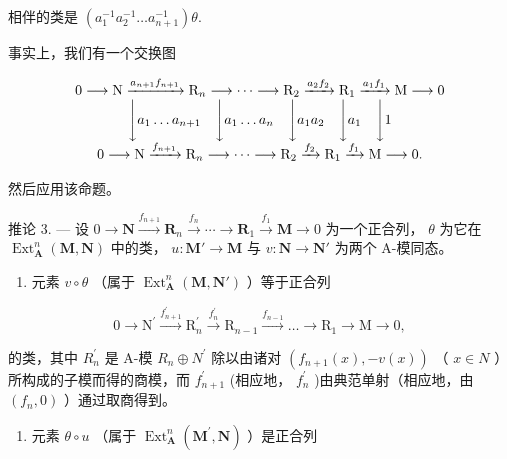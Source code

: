 相伴的类是 \((a_{1}^{-1}a_{2}^{-1}\dots a_{n + 1}^{-1})\theta .\)

事实上，我们有一个交换图

\[
\begin{array}{c} 0 \longrightarrow \mathrm{N} \xrightarrow {a _ {n + 1} f _ {n + 1}} \mathrm{R} _ {n} \longrightarrow \dots \longrightarrow \mathrm{R} _ {2} \xrightarrow {a _ {2} f _ {2}} \mathrm{R} _ {1} \xrightarrow {a _ {1} f _ {1}} \mathrm{M} \longrightarrow 0 \\ \Biggl \downarrow a _ {1} \dots a _ {n + 1} \quad \Biggl \downarrow a _ {1} \dots a _ {n} \quad \Biggl \downarrow a _ {1} a _ {2} \quad \Biggl \downarrow a _ {1} \quad \Biggl \downarrow 1 \\ 0 \longrightarrow \mathrm{N} \xrightarrow {f _ {n + 1}} \mathrm{R} _ {n} \longrightarrow \dots \longrightarrow \mathrm{R} _ {2} \xrightarrow {f _ {2}} \mathrm{R} _ {1} \xrightarrow {f _ {1}} \mathrm{M} \longrightarrow 0. \end{array}
\]

然后应用该命题。

推论 3. --- 设 \(0 \to \mathbf{N} \xrightarrow{f_{n+1}} \mathbf{R}_{n} \xrightarrow{f_{n}} \cdots \to \mathbf{R}_{1} \xrightarrow{f_{1}} \mathbf{M} \to 0\) 为一个正合列， \(\theta\) 为它在 \(\operatorname{Ext}_{\mathbf{A}}^{n}(\mathbf{M}, \mathbf{N})\) 中的类， \(u: \mathbf{M}' \to \mathbf{M}\) 与 \(v: \mathbf{N} \to \mathbf{N}'\) 为两个 A-模同态。

\begin{enumerate}
\def\labelenumi{\alph{enumi})}
\tightlist
\item
  元素 \(v \circ \theta\) （属于 \(\operatorname{Ext}_{\mathbf{A}}^{n}(\mathbf{M}, \mathbf{N}')\) ）等于正合列
\end{enumerate}

\[
0 \rightarrow \mathrm{N} ^ {\prime} \xrightarrow {f _ {n + 1} ^ {\prime}} \mathrm{R} _ {n} ^ {\prime} \xrightarrow {f _ {n} ^ {\prime}} \mathrm{R} _ {n - 1} \xrightarrow {f _ {n - 1}} \dots \rightarrow \mathrm{R} _ {1} \rightarrow \mathrm{M} \rightarrow 0,
\]

的类，其中 \(R_{n}^{\prime}\) 是 A-模 \(R_{n} \oplus N^{\prime}\) 除以由诸对 \((f_{n+1}(x), -v(x))\) （ \(x \in N\) ）所构成的子模而得的商模，而 \(f_{n+1}^{\prime}\) (相应地， \(f_{n}^{\prime}\) )由典范单射（相应地，由 \((f_{n}, 0)\) ）通过取商得到。

\begin{enumerate}
\def\labelenumi{\alph{enumi})}
\setcounter{enumi}{1}
\tightlist
\item
  元素 \(\theta \circ u\) （属于 \(\operatorname{Ext}_{\mathbf{A}}^{n}(\mathbf{M}^{\prime}, \mathbf{N})\) ）是正合列
\end{enumerate}

